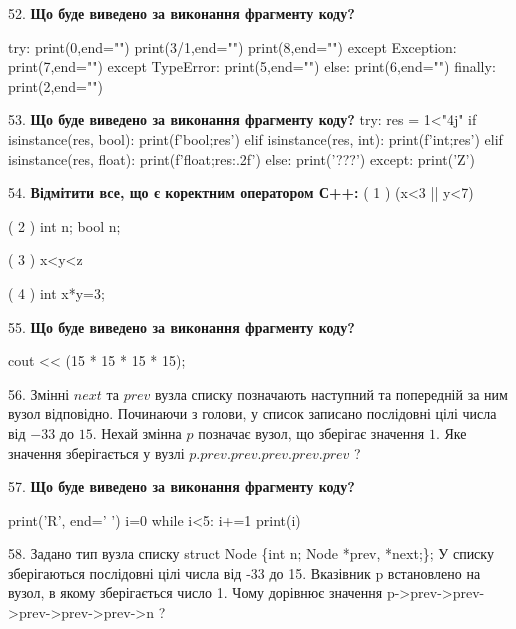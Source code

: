 \documentclass[11pt]{article}
\begin{document}
52. \textbf{Що буде виведено за виконання фрагменту коду?}

try:
    print(0,end="")
    print(3/1,end="")
    print(8,end="")
except Exception: print(7,end="")
except TypeError: print(5,end="")
else: print(6,end="")
finally: print(2,end="")
\par\vspace{5mm}

53. \textbf{Що буде виведено за виконання фрагменту коду?}
try:
    res = 1<"4j"
    if isinstance(res, bool):
        print(f'bool;{res}')
    elif isinstance(res, int):
        print(f'int;{res}')
    elif isinstance(res, float):
        print(f'float;{res:.2f}')
    else:
        print('???')
except:
    print('Z')
\par\vspace{5mm}

54. %
\textbf{Відмітити все, що є коректним оператором С++:}
( 1 ) (x<3 || y<7)

( 2 ) int n; bool n;

( 3 ) x<y<z

( 4 ) int x*y=3;
\par\vspace{5mm}

55. \textbf{Що буде виведено за виконання фрагменту коду?}

cout << (15 * 15 * 15 * 15);
\par\vspace{5mm}

56. 
Змінні $next$ та $prev$ вузла списку позначають наступний та попередній за ним вузол відповідно. Починаючи з голови, у список записано послідовні цілі числа від $-33$ до $15$. Нехай змінна $p$ позначає вузол, що зберігає значення $1$.
Яке значення зберігається у вузлі $p.prev.prev.prev.prev.prev$ ?
\par\vspace{5mm}

57. \textbf{Що буде виведено за виконання фрагменту коду?}

print('R', end=' ')
i=0
while i<5:
    i+=1
print(i)

\par\vspace{5mm}

58. 
Задано тип вузла списку
struct Node \{int n; Node *prev, *next;\};
У списку зберігаються послідовні цілі числа від -33 до 15. Вказівник p встановлено на вузол, в якому зберігається число 1.
Чому дорівнює значення p->prev->prev->prev->prev->prev->n ?\par\vspace{5mm}
\end{document}
